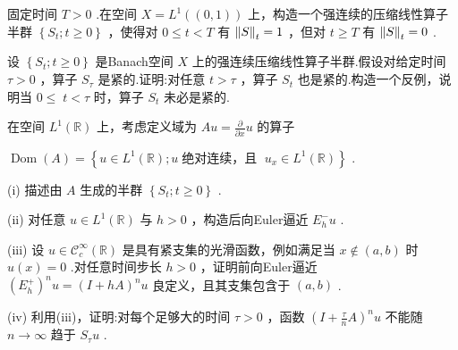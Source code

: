\begin{rbhw}
固定时间 $T > 0$ .在空间 $X = {L}^{1}\left( \left(  {0,1}\right)  \right)$ 上，构造一个强连续的压缩线性算子半群 $\left\{  {{S}_{t};t \geq  0}\right\}$ ，使得对 $0 \leq  t < T$ 有 $\norm{S}_{t} = 1$ ，但对 $t \geq  T$ 有 $\norm{S}_{t} = 0$ .

\end{rbhw}

\begin{rbhw}
设 $\left\{  {{S}_{t};t \geq  0}\right\}$ 是Banach空间 $X$ 上的强连续压缩线性算子半群.假设对给定时间 $\tau  > 0$ ，算子 ${S}_{\tau }$ 是紧的.证明:对任意 $t > \tau$ ，算子 ${S}_{t}$ 也是紧的.构造一个反例，说明当 $0 \leq \; t < \tau$ 时，算子 ${S}_{t}$ 未必是紧的.

\end{rbhw}

\begin{rbhw}
在空间 ${L}^{1}\left( \mathbb{R}\right)$ 上，考虑定义域为 ${Au} = \frac{\partial }{\partial x}u$ 的算子

$\operatorname{Dom}\left( A\right)  = \left\{  {u \in  {L}^{1}\left( \mathbb{R}\right) ;u\;\text{绝对连续，且 }\;{u}_{x} \in  {L}^{1}\left( \mathbb{R}\right) }\right\}$ .

(i) 描述由 $A$ 生成的半群 $\left\{  {{S}_{t};t \geq  0}\right\}$ .

(ii) 对任意 $u \in  {L}^{1}\left( \mathbb{R}\right)$ 与 $h > 0$ ，构造后向Euler逼近 ${E}_{h}^{ - }u$ .

(iii) 设 $u \in  {\mathcal{C}}_{c}^{\infty }\left( \mathbb{R}\right)$ 是具有紧支集的光滑函数，例如满足当 $x \notin  \left(  {a,b}\right)$ 时 $u\left( x\right)  = 0$ .对任意时间步长 $h > 0$ ，证明前向Euler逼近 ${\left( {E}_{h}^{ + }\right) }^{n}u = {\left( I + hA\right) }^{n}u$ 良定义，且其支集包含于 $\left(  {a,b}\right)$ .

(iv) 利用(iii)，证明:对每个足够大的时间 $\tau  > 0$ ，函数 ${\left( I + \frac{\tau }{n}A\right) }^{n}u$ 不能随 $n \rightarrow  \infty$ 趋于 ${S}_{\tau }u$ .

\end{rbhw}
